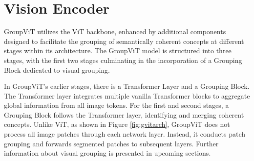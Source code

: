 \section{Vision Encoder}
\label{sec:vision}
 
GroupViT utilizes the ViT backbone, enhanced by additional components designed to facilitate the grouping of semantically coherent concepts at different stages within its architecture. The GroupViT model is structured into three stages, with the first two stages culminating in the incorporation of a Grouping Block dedicated to visual grouping.

In GroupViT's earlier stages, there is a Transformer Layer and a Grouping Block. The Transformer layer integrates multiple vanilla Transformer blocks \cite{vaswani2017attention}\cite{dosovitskiy2020image} to aggregate global information from all image tokens. For the first and second stages, a Grouping Block follows the Transformer layer, identifying and merging coherent concepts. Unlike ViT, as shown in Figure \ref{fig:gvitarch}, GroupViT does not process all image patches through each network layer. Instead, it conducts patch grouping and forwards segmented patches to subsequent layers. Further information about visual grouping is presented in upcoming sections.\\

